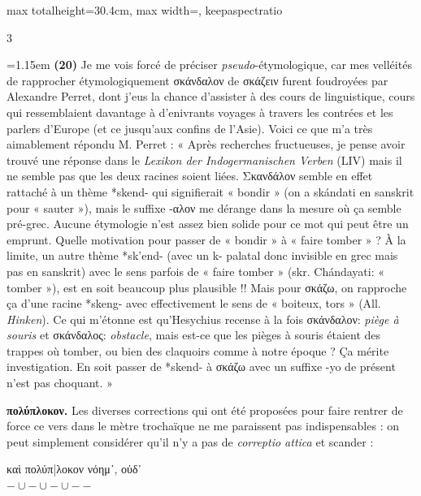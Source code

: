 \documentclass[11pt,twoside]{book}
\newcommand{\currHeadLE}{}
\newcommand{\italique}[1]{\textit{#1}}
\newcommand{\citComm}[1]{\begin{quoting}[vskip=0.4pt,leftmargin=0.7em,rightmargin=0.2em]#1\end{quoting}}
\newcommand{\R}{\textbf{R}}
\begin{document}
\begin{adjustbox}{max totalheight=30.4cm, max width=\textwidth, keepaspectratio}
\begin{minipage}{\textwidth}
{\begin{multicols}{3}
\par\vspace{1.5pt}
\noindent\hangindent=1.15em {\color{sepiaNote}\textbf{(20)}} Je me vois forcé de préciser \italique{pseudo}-étymologique, car mes velléités de rapprocher étymologiquement σκάνδαλον de σκάζειν furent foudroyées par Alexandre Perret, dont j'eus la chance d'assister à des cours de linguistique, cours qui ressemblaient davantage à d'enivrants voyages à travers les contrées et les parlers d'Europe (et ce jusqu'aux confins de l'Asie). Voici ce que m'a très aimablement répondu M. Perret : « Après recherches fructueuses, je pense avoir trouvé une réponse dans le \italique{Lexikon der Indogermanischen Verben} (LIV) mais il ne semble pas que les deux racines soient liées. Σκανδάλον semble en effet rattaché à un thème *skend- qui signifierait « bondir » (on a skándati en sanskrit pour « sauter »), mais le suffixe -αλον me dérange dans la mesure où ça semble pré-grec. Aucune étymologie n'est assez bien solide pour ce mot qui peut être un emprunt. Quelle motivation pour passer de « bondir » à « faire tomber » ? À la limite, un autre thème *sk'end- (avec un k- palatal donc invisible en grec mais pas en sanskrit) avec le sens parfois de « faire tomber » (skr. Chándayati: « tomber »), est en soit beaucoup plus plausible !! Mais pour σκάζω, on rapproche ça d'une racine *skeng- avec effectivement le sens de « boiteux, tors » (All. \italique{Hinken}). Ce qui m'étonne est qu'Hesychius recense à la fois σκάνδαλον: \italique{piège à souris} et σκάνδαλος: \italique{obstacle}, mais est-ce que les pièges à souris étaient des trappes où tomber, ou bien des claquoirs comme à notre époque ? Ça mérite investigation. En soit passer de *skend- à σκάζω avec un suffixe -yo de présent n'est pas choquant. »
\par\vspace{1.5pt}
 \textbf{πολύπλοκον.} Les diverses corrections qui ont été proposées pour faire rentrer de force ce vers dans le mètre trochaïque ne me paraissent pas indispensables : on peut simplement considérer qu'il n'y a pas de \italique{correptio attica} et scander :
\citComm{καὶ πολύπ|λοκον νόημ᾽, οὐδ᾽\\
$ - \cup - \cup - \cup - - $}
\par\end{multicols}}
\end{minipage}\end{adjustbox}
\clearpage\ifodd\value{page}\hbox{}\newpage\fi
\renewcommand{\currHeadLE}{ΑΡΙΣΤΟΦΑΝΟΥΣ ΘΕΣΜΟΦΟΡΙΑΖΟΥΣΑΙ · CODEX RAVENNAS 429 (\R)}
\end{document}
